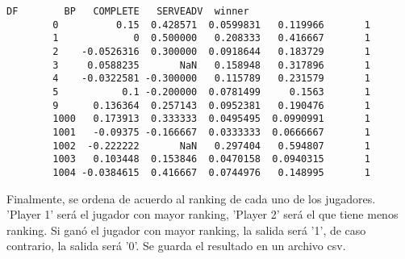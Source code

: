 \documentclass[11pt]{article}
\begin{document}
\begin{Verbatim}[commandchars=\\\{\}]
                     DF        BP   COMPLETE   SERVEADV  winner  
        0          0.15  0.428571  0.0599831   0.119966       1  
        1             0  0.500000   0.208333   0.416667       1  
        2    -0.0526316  0.300000  0.0918644   0.183729       1  
        3     0.0588235       NaN   0.158948   0.317896       1  
        4    -0.0322581 -0.300000   0.115789   0.231579       1  
        5           0.1 -0.200000  0.0781499     0.1563       1  
        9      0.136364  0.257143  0.0952381   0.190476       1  
        1000   0.173913  0.333333  0.0495495  0.0990991       1  
        1001   -0.09375 -0.166667  0.0333333  0.0666667       1  
        1002  -0.222222       NaN   0.297404   0.594807       1  
        1003   0.103448  0.153846  0.0470158  0.0940315       1  
        1004 -0.0384615  0.416667  0.0744976   0.148995       1  
\end{Verbatim}
            
    Finalmente, se ordena de acuerdo al ranking de cada uno de los
jugadores. 'Player 1' será el jugador con mayor ranking, 'Player 2' será
el que tiene menos ranking. Si ganó el jugador con mayor ranking, la
salida será '1', de caso contrario, la salida será '0'. Se guarda el
resultado en un archivo csv.
\end{document}
